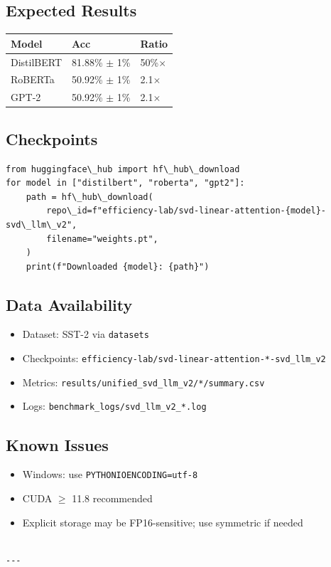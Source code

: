 \subsection{Expected Results}

\begin{table}[H]
\centering
\small
\begin{tabular}{lll}
\toprule
\textbf{Model} & \textbf{Acc} & \textbf{Ratio} \\
\midrule
DistilBERT & 81.88\% $\pm$ 1\% & 50\%$\times$ \\
RoBERTa & 50.92\% $\pm$ 1\% & 2.1$\times$ \\
GPT-2 & 50.92\% $\pm$ 1\% & 2.1$\times$ \\
\bottomrule
\end{tabular}
\end{table}

\subsection{Checkpoints}

\begin{lstlisting}
from huggingface\_hub import hf\_hub\_download
for model in ["distilbert", "roberta", "gpt2"]:
    path = hf\_hub\_download(
        repo\_id=f"efficiency-lab/svd-linear-attention-{model}-svd\_llm\_v2",
        filename="weights.pt",
    )
    print(f"Downloaded {model}: {path}")
\end{lstlisting}

\subsection{Data Availability}

\begin{itemize}
\item Dataset: SST-2 via \texttt{datasets}
\item Checkpoints: \texttt{efficiency-lab/svd-linear-attention-*-svd\_llm\_v2}
\item Metrics: \texttt{results/unified\_svd\_llm\_v2/*/summary.csv}
\item Logs: \texttt{benchmark\_logs/svd\_llm\_v2\_*.log}

\end{itemize}
\subsection{Known Issues}

\begin{itemize}
\item Windows: use \texttt{PYTHONIOENCODING=utf-8}
\item CUDA $\ge$ 11.8 recommended
\item Explicit storage may be FP16-sensitive; use symmetric if needed
\end{itemize}
\begin{lstlisting}

---
\end{lstlisting}